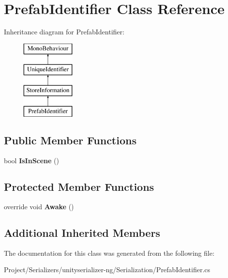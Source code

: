 \hypertarget{class_prefab_identifier}{}\section{Prefab\+Identifier Class Reference}
\label{class_prefab_identifier}
Inheritance diagram for Prefab\+Identifier\+:\begin{figure}[H]
\begin{center}
\leavevmode
\includegraphics[height=4.000000cm]{class_prefab_identifier}
\end{center}
\end{figure}
\subsection*{Public Member Functions}
\begin{DoxyCompactItemize}
\item 
\mbox{\label{class_prefab_identifier_a30cb15dcd8a3f8ed5395a753b3ae9926}} 
bool {\bfseries Is\+In\+Scene} ()
\end{DoxyCompactItemize}
\subsection*{Protected Member Functions}
\begin{DoxyCompactItemize}
\item 
\mbox{\label{class_prefab_identifier_a851c02d913a5941dfbd1a472f3b3d6f3}} 
override void {\bfseries Awake} ()
\end{DoxyCompactItemize}
\subsection*{Additional Inherited Members}


The documentation for this class was generated from the following file\+:\begin{DoxyCompactItemize}
\item 
Project/\+Serializers/unityserializer-\/ng/\+Serialization/Prefab\+Identifier.\+cs\end{DoxyCompactItemize}
